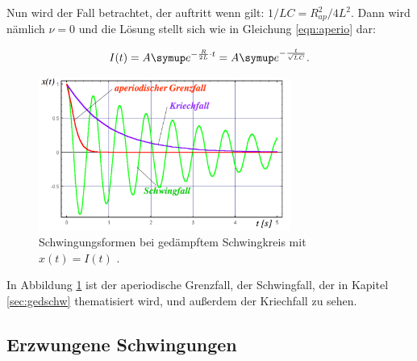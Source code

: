 Nun wird der Fall betrachtet, der auftritt wenn gilt:
$1/LC = R_{ap}^2/4L^2$. Dann wird nämlich $\nu = 0$ und die Lösung stellt
sich wie in Gleichung \eqref{eqn:aperio} dar:

\begin{equation}
  I(t) = A \g{e}^{-\frac{R}{2L}\cdot t} = A \g{e}^{-\frac{t}{\sqrt{LC}}}.
\end{equation}

\begin{figure}[h]
  \centering
  \includegraphics[height = 5cm]{aperio.pdf}
  \caption{Schwingungsformen bei gedämpftem Schwingkreis mit $x(t) = I(t)$ \cite{weis}.}
  \label{fig:aperio}
\end{figure}

In Abbildung \ref{fig:aperio} ist der aperiodische Grenzfall, der
Schwingfall, der in Kapitel \ref{sec:gedschw} thematisiert wird, und
außerdem der Kriechfall zu sehen.

\subsection{Erzwungene Schwingungen}
